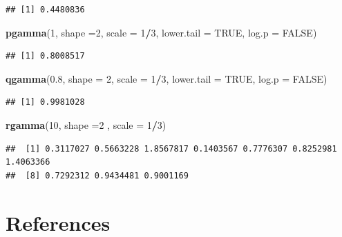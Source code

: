 \documentclass[
]{book}
\newenvironment{Shaded}{\begin{snugshade}}{\end{snugshade}}
\newcommand{\AttributeTok}[1]{\textcolor[rgb]{0.13,0.29,0.53}{#1}}
\newcommand{\ConstantTok}[1]{\textcolor[rgb]{0.56,0.35,0.01}{#1}}
\newcommand{\DecValTok}[1]{\textcolor[rgb]{0.00,0.00,0.81}{#1}}
\newcommand{\FloatTok}[1]{\textcolor[rgb]{0.00,0.00,0.81}{#1}}
\newcommand{\FunctionTok}[1]{\textcolor[rgb]{0.13,0.29,0.53}{\textbf{#1}}}
\newcommand{\NormalTok}[1]{#1}
\newcommand{\SpecialCharTok}[1]{\textcolor[rgb]{0.81,0.36,0.00}{\textbf{#1}}}
\begin{document}
\begin{verbatim}
## [1] 0.4480836
\end{verbatim}

\begin{Shaded}
\begin{Highlighting}[]
\FunctionTok{pgamma}\NormalTok{(}\DecValTok{1}\NormalTok{, }\AttributeTok{shape =}\DecValTok{2}\NormalTok{, }\AttributeTok{scale =} \DecValTok{1}\SpecialCharTok{/}\DecValTok{3}\NormalTok{, }\AttributeTok{lower.tail =} \ConstantTok{TRUE}\NormalTok{,}
       \AttributeTok{log.p =} \ConstantTok{FALSE}\NormalTok{)}
\end{Highlighting}
\end{Shaded}

\begin{verbatim}
## [1] 0.8008517
\end{verbatim}

\begin{Shaded}
\begin{Highlighting}[]
\FunctionTok{qgamma}\NormalTok{(}\FloatTok{0.8}\NormalTok{, }\AttributeTok{shape =} \DecValTok{2}\NormalTok{,  }\AttributeTok{scale =} \DecValTok{1}\SpecialCharTok{/}\DecValTok{3}\NormalTok{, }\AttributeTok{lower.tail =} \ConstantTok{TRUE}\NormalTok{,}
       \AttributeTok{log.p =} \ConstantTok{FALSE}\NormalTok{)}
\end{Highlighting}
\end{Shaded}

\begin{verbatim}
## [1] 0.9981028
\end{verbatim}

\begin{Shaded}
\begin{Highlighting}[]
\FunctionTok{rgamma}\NormalTok{(}\DecValTok{10}\NormalTok{, }\AttributeTok{shape =}\DecValTok{2}\NormalTok{ , }\AttributeTok{scale =} \DecValTok{1}\SpecialCharTok{/}\DecValTok{3}\NormalTok{)}
\end{Highlighting}
\end{Shaded}

\begin{verbatim}
##  [1] 0.3117027 0.5663228 1.8567817 0.1403567 0.7776307 0.8252981 1.4063366
##  [8] 0.7292312 0.9434481 0.9001169
\end{verbatim}

\newpage

\hypertarget{references}{%
\section{References}\label{references}}
\end{document}
